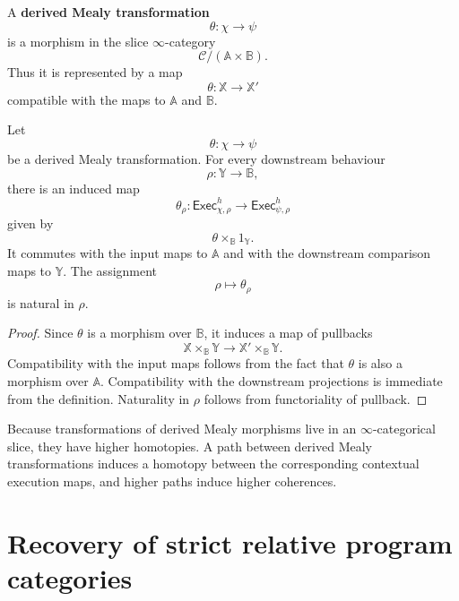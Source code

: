 \begin{definition}
\label{def:derived-mealy-transformation-relative}
A \textbf{derived Mealy transformation}
\[
\theta:\chi\to\psi
\]
is a morphism in the slice \(\infty\)-category
\[
\mathcal C/(\mathbb A\times\mathbb B).
\]
Thus it is represented by a map
\[
\theta:\mathbb X\to\mathbb X'
\]
compatible with the maps to \(\mathbb A\) and \(\mathbb B\).
\end{definition}

\begin{proposition}
\label{prop:derived-mealy-transformations-contextual}
Let
\[
\theta:\chi\to\psi
\]
be a derived Mealy transformation. For every downstream behaviour
\[
\rho:\mathbb Y\to\mathbb B,
\]
there is an induced map
\[
\theta_\rho:
\mathsf{Exec}^h_{\chi,\rho}
\to
\mathsf{Exec}^h_{\psi,\rho}
\]
given by
\[
\theta\times_{\mathbb B}1_{\mathbb Y}.
\]
It commutes with the input maps to \(\mathbb A\) and with the downstream
comparison maps to \(\mathbb Y\). The assignment
\[
\rho\longmapsto\theta_\rho
\]
is natural in \(\rho\).
\end{proposition}

\begin{proof}
Since \(\theta\) is a morphism over \(\mathbb B\), it induces a map of
pullbacks
\[
\mathbb X\times_{\mathbb B}\mathbb Y
\to
\mathbb X'\times_{\mathbb B}\mathbb Y.
\]
Compatibility with the input maps follows from the fact that \(\theta\) is
also a morphism over \(\mathbb A\). Compatibility with the downstream
projections is immediate from the definition. Naturality in \(\rho\) follows
from functoriality of pullback.
\end{proof}

\begin{remark}
\label{rem:higher-transformations-contextual}
Because transformations of derived Mealy morphisms live in an
\(\infty\)-categorical slice, they have higher homotopies. A path between
derived Mealy transformations induces a homotopy between the corresponding
contextual execution maps, and higher paths induce higher coherences.
\end{remark}

\section{Recovery of strict relative program categories}
\label{sec:strict-relative-recovery-derived}


